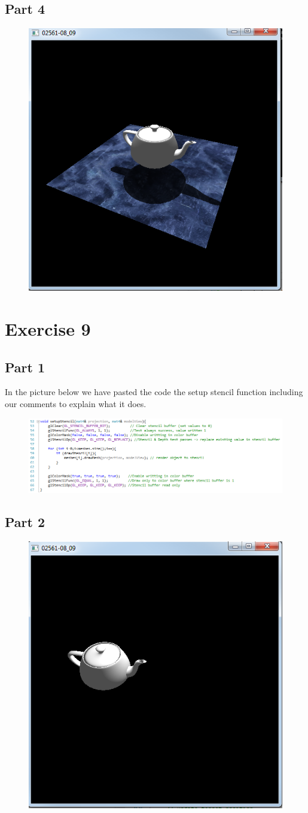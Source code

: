\documentclass[11pt]{article}
\begin{document}
\subsection{Part 4}
\begin{figure}[H]
	\centering
	\includegraphics[width=0.5\linewidth]{images/e08p4}
	\label{fig:e08p4}
\end{figure}

\section{Exercise 9}
\subsection{Part 1}
In the picture below we have pasted the code the setup stencil function including our comments to explain what it does.

\begin{figure}[H]
	\centering
	\includegraphics[width=0.5\linewidth]{images/e09p1}
	\label{fig:e09p1}
\end{figure}

\subsection{Part 2}
\begin{figure}[H]
	\centering
	\includegraphics[width=0.5\linewidth]{images/e09p2}
	\label{fig:e09p2}
\end{figure}
\end{document}
